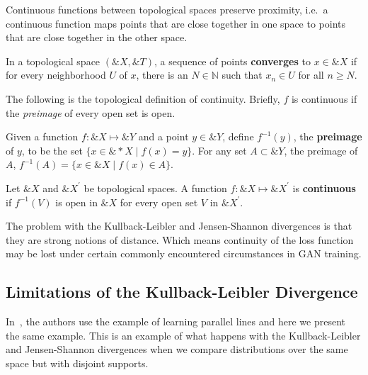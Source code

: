 Continuous functions between topological spaces preserve proximity,
i.e.\ a continuous function maps points that are close together in one
space to points that are close together in the other space.

\begin{definition}%
  \label{def:convergence-topological-space}
  In a topological space $(\&X, \&T)$, a sequence of points
  \textbf{converges} to $x \in \&X$ if for every neighborhood $U$ of
  $x$, there is an $N \in \mathbb{N}$ such that $x_n \in U$ for all
  $n \geq N$.
\end{definition}

The following is the topological definition of continuity. Briefly,
$f$ is continuous if the \textit{preimage} of every open set is open.

\begin{definition}%
  \label{def:pre-image}
  Given a function $f: \&X \mapsto \&Y$ and a point $y \in \&Y$,
  define $f^{-1}(y)$, the \textbf{preimage} of $y$, to be the set
  $\{x \in \&*X \mid f(x) = y\}$.  For any set $A \subset \&Y$, the
  preimage of $A$, $f^{-1}(A) = \{x \in \&X \mid f(x) \in A\}$.
\end{definition}

\begin{definition}%
  \label{def:continuity-topological-space}
  Let $\&X$ and $\&X^\prime$ be topological spaces. A function
  $f: \&X \mapsto \&X^\prime$ is \textbf{continuous} if $f^{-1}(V)$ is
  open in $\&X$ for every open set $V$ in $\&X^\prime$.
\end{definition}

The problem with the Kullback-Leibler and Jensen-Shannon divergences
is that they are strong notions of distance. Which means continuity of
the loss function may be lost under certain commonly encountered
circumstances in GAN training.

\subsection{Limitations of the Kullback-Leibler Divergence}

In~\cite{ref:arjovsky-2017}, the authors use the example of learning
parallel lines and here we present the same example. This is an
example of what happens with the Kullback-Leibler and Jensen-Shannon
divergences when we compare distributions over the same space but with
disjoint supports.

